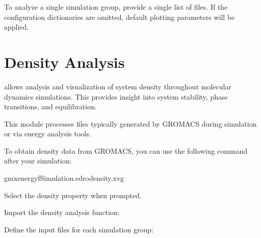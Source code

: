 \documentclass[a4paper,10pt,english]{sphinxmanual}
\begin{document}
\sphinxAtStartPar
To analyze a single simulation group, provide a single list of files. If the configuration dictionaries are omitted, default plotting parameters will be applied.


\section{Density Analysis}
\label{\detokenize{Input:density-analysis}}
\sphinxAtStartPar
{} allows analysis and visualization of system density throughout molecular dynamics simulations. This provides insight into system stability, phase transitions, and equilibration.

\sphinxAtStartPar
This module processes  files typically generated by GROMACS during simulation or via energy analysis tools.

\sphinxAtStartPar
To obtain density data from GROMACS, you can use the following command after your simulation:

\begin{sphinxVerbatim}[commandchars=\\\{\}]
gmxenergy\PYGZhy{}fSimulation.edr\PYGZhy{}odensity.xvg
\end{sphinxVerbatim}

\sphinxAtStartPar
Select the density property when prompted.

\sphinxAtStartPar
{}

\sphinxAtStartPar
Import the density analysis function:

\begin{sphinxVerbatim}[commandchars=\\\{\}]
 
\end{sphinxVerbatim}

\sphinxAtStartPar
Define the input files for each simulation group:
\end{document}
